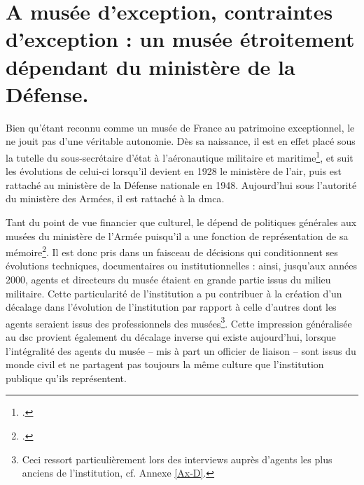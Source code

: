 \section{\label{I-B-1}A musée d’exception, contraintes d’exception : un musée étroitement dépendant du ministère de la Défense. }

Bien qu'étant reconnu comme un musée de France au patrimoine exceptionnel, le \mae ne jouit pas d'une véritable autonomie. Dès sa naissance, il est en effet placé sous la tutelle du sous-secrétaire d'état à l'aéronautique militaire et maritime\footcite{terrierAeroportParisBourget2019}, et suit les évolutions de celui-ci lorsqu'il devient en 1928 le ministère de l'air, puis est rattaché au ministère de la Défense nationale en 1948. Aujourd'hui sous l'autorité du ministère des Armées, il est rattaché à la \gls{dmca}.


Tant du point de vue financier que culturel, le \mae dépend de politiques générales aux musées du ministère de l'Armée puisqu'il a une fonction de représentation de sa mémoire\footcite{museedelairetdelespaceProjetScientifiqueCulturel2020}. Il est donc pris dans un faisceau de décisions qui conditionnent ses évolutions techniques, documentaires ou institutionnelles : ainsi, jusqu'aux années 2000, agents et directeurs du musée étaient en grande partie issus du milieu militaire. Cette particularité de l'institution a pu contribuer à la création d'un décalage dans l'évolution de l'institution  par rapport à celle d'autres dont les agents seraient issus des professionnels des musées\footnote{Ceci ressort particulièrement lors des interviews auprès d'agents les plus anciens de l'institution, cf. Annexe \ref{Ax-D}. }. Cette impression généralisée au \ac{dsc} provient également du décalage inverse qui existe aujourd'hui, lorsque l'intégralité des agents du musée -- mis à part un officier de liaison -- sont issus du monde civil et ne partagent pas toujours la même culture que l'institution publique qu'ils représentent.

